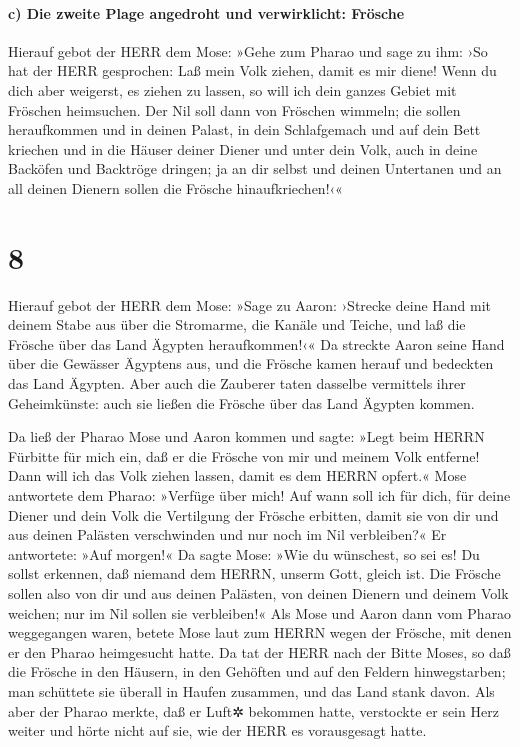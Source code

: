 \hypertarget{c-die-zweite-plage-angedroht-und-verwirklicht-fruxf6sche}{%
\paragraph{c) Die zweite Plage angedroht und verwirklicht:
Frösche}\label{c-die-zweite-plage-angedroht-und-verwirklicht-fruxf6sche}}

 Hierauf gebot der HERR dem Mose: »Gehe zum Pharao und
sage zu ihm: ›So hat der HERR gesprochen: Laß mein Volk ziehen, damit es
mir diene!  Wenn du dich aber weigerst, es ziehen zu
lassen, so will ich dein ganzes Gebiet mit Fröschen heimsuchen.
 Der Nil soll dann von Fröschen wimmeln; die sollen
heraufkommen und in deinen Palast, in dein Schlafgemach und auf dein
Bett kriechen und in die Häuser deiner Diener und unter dein Volk, auch
in deine Backöfen und Backtröge dringen;  ja an dir
selbst und deinen Untertanen und an all deinen Dienern sollen die
Frösche hinaufkriechen!‹«

\hypertarget{section-7}{%
\section{8}\label{section-7}}

 Hierauf gebot der HERR dem Mose: »Sage zu Aaron: ›Strecke
deine Hand mit deinem Stabe aus über die Stromarme, die Kanäle und
Teiche, und laß die Frösche über das Land Ägypten heraufkommen!‹«
 Da streckte Aaron seine Hand über die Gewässer Ägyptens
aus, und die Frösche kamen herauf und bedeckten das Land Ägypten.
 Aber auch die Zauberer taten dasselbe vermittels ihrer
Geheimkünste: auch sie ließen die Frösche über das Land Ägypten kommen.

 Da ließ der Pharao Mose und Aaron kommen und sagte: »Legt
beim HERRN Fürbitte für mich ein, daß er die Frösche von mir und meinem
Volk entferne! Dann will ich das Volk ziehen lassen, damit es dem HERRN
opfert.«  Mose antwortete dem Pharao: »Verfüge über mich!
Auf wann soll ich für dich, für deine Diener und dein Volk die
Vertilgung der Frösche erbitten, damit sie von dir und aus deinen
Palästen verschwinden und nur noch im Nil verbleiben?«  Er
antwortete: »Auf morgen!« Da sagte Mose: »Wie du wünschest, so sei es!
Du sollst erkennen, daß niemand dem HERRN, unserm Gott, gleich ist.
 Die Frösche sollen also von dir und aus deinen Palästen,
von deinen Dienern und deinem Volk weichen; nur im Nil sollen sie
verbleiben!«  Als Mose und Aaron dann vom Pharao
weggegangen waren, betete Mose laut zum HERRN wegen der Frösche, mit
denen er den Pharao heimgesucht hatte.  Da tat der HERR
nach der Bitte Moses, so daß die Frösche in den Häusern, in den Gehöften
und auf den Feldern hinwegstarben;  man schüttete sie
überall in Haufen zusammen, und das Land stank davon. 
Als aber der Pharao merkte, daß er Luft✲ bekommen hatte, verstockte er
sein Herz weiter und hörte nicht auf sie, wie der HERR es vorausgesagt
hatte.


